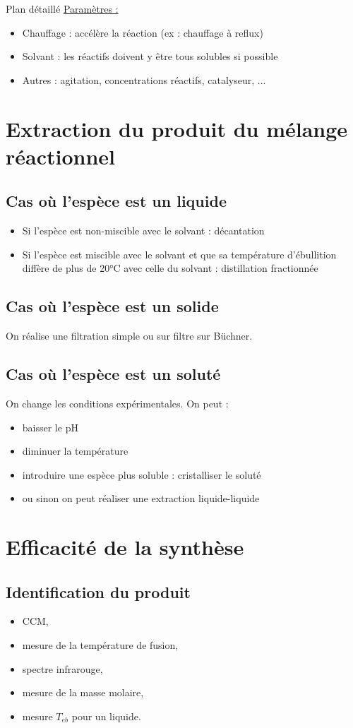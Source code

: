 \begin{reportBlock}{Plan détaillé}
\underline{Paramètres :}
\begin{itemize}
    \item Chauffage : accélère la réaction (ex : chauffage à reflux)
    \item Solvant : les réactifs doivent y être tous solubles si possible
    \item Autres : agitation, concentrations réactifs, catalyseur, ...
\end{itemize}

\section{Extraction du produit du mélange réactionnel}
\subsection{Cas où l'espèce est un liquide}
\begin{itemize}
    \item Si l'espèce est non-miscible avec le solvant : décantation
    \item Si l'espèce est miscible avec le solvant et que sa température d'ébullition diffère de plus de 20°C avec celle du solvant : distillation fractionnée
\end{itemize}
\subsection{Cas où l'espèce est un solide}
On réalise une filtration simple ou sur filtre sur Büchner.
\subsection{Cas où l'espèce est un soluté}
On change les conditions expérimentales. On peut :
\begin{itemize}
    \item baisser le pH
    \item diminuer la température
    \item introduire une espèce plus soluble : cristalliser le soluté
    \item ou sinon on peut réaliser une extraction liquide-liquide
\end{itemize}

\section{Efficacité de la synthèse}
\subsection{Identification du produit}
\begin{itemize}
    \item CCM,
    \item mesure de la température de fusion,
    \item spectre infrarouge,
    \item mesure de la masse molaire,
    \item mesure $T_{eb}$ pour un liquide.
\end{itemize}


\end{reportBlock}
